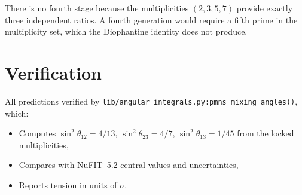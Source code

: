 \documentclass[11pt,letterpaper]{article}
\numberwithin{equation}{section}
\begin{document}
There is no fourth stage because the multiplicities $(2, 3, 5, 7)$ provide
exactly three independent ratios. A fourth generation would require a fifth
prime in the multiplicity set, which the Diophantine identity does not
produce.

\section{Verification}
\label{sec:verification}

All predictions verified by \texttt{lib/angular\_integrals.py:pmns\_mixing\_angles()},
which:
\begin{itemize}
  \item Computes $\sin^2\theta_{12} = 4/13$, $\sin^2\theta_{23} = 4/7$,
    $\sin^2\theta_{13} = 1/45$ from the locked multiplicities,
  \item Compares with NuFIT~5.2 central values and uncertainties,
  \item Reports tension in units of $\sigma$.
\end{itemize}
\end{document}
